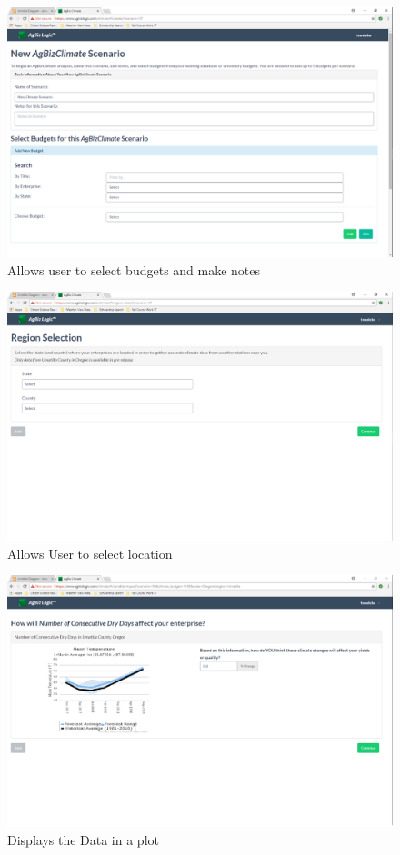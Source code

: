 \documentclass[onecolumn, draftclsnofoot,10pt, compsoc]{article}
\begin{document}
	\begin{figure}[h]				
		\includegraphics[width=\linewidth]{Figures/ClimateScenario.eps}
		\caption{Allows user to select budgets and make notes}
		\label{figure3.2}					
	\end{figure}
					
	\begin{figure}[h]
		\includegraphics[width=\linewidth]{Figures/SelectStateAndCounty.eps}
		\caption{Allows User to select location}
		\label{figure3.3}
	\end{figure}
					
	\begin{figure}[h]
		\includegraphics[width=\linewidth]{Figures/ChartPage.eps}
		\caption{Displays the Data in a plot}
		\label{figure3.4}
	\end{figure}
					
\end{document}
